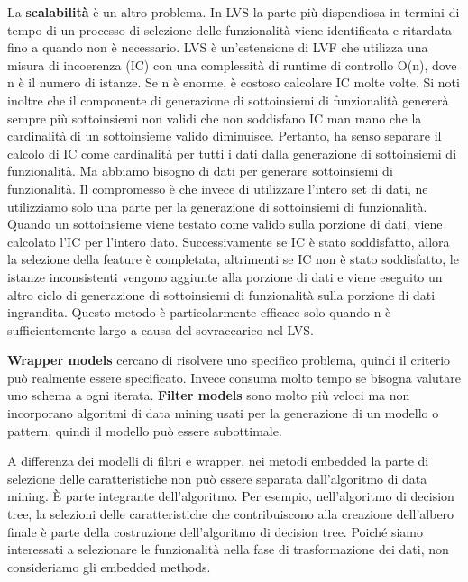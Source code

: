 \documentclass[a4paper]{extarticle}
\begin{document}
La \textbf{scalabilità} è un altro problema. In LVS la parte più dispendiosa in termini di tempo di un processo di selezione delle funzionalità viene identificata e ritardata fino a quando non è necessario. LVS è un'estensione di LVF che utilizza una misura di incoerenza (IC) con una complessità di runtime di controllo O(n), dove n è il numero di istanze. Se n è enorme, è costoso calcolare IC molte volte. Si noti inoltre che il componente di generazione di sottoinsiemi di funzionalità genererà sempre più sottoinsiemi non validi che non soddisfano IC man mano che la cardinalità di un sottoinsieme valido diminuisce. Pertanto, ha senso separare il calcolo di IC come cardinalità per tutti i dati dalla generazione di sottoinsiemi di funzionalità. Ma abbiamo bisogno di dati per generare sottoinsiemi di funzionalità. Il compromesso è che invece di utilizzare l'intero set di dati, ne utilizziamo solo una parte per la generazione di sottoinsiemi di funzionalità. Quando un sottoinsieme viene testato come valido sulla porzione di dati, viene calcolato l'IC per l'intero dato. Successivamente se IC è stato soddisfatto, allora la selezione della feature è completata, altrimenti se IC non è stato soddisfatto, le istanze inconsistenti vengono aggiunte alla porzione di dati e viene eseguito un altro ciclo di generazione di sottoinsiemi di funzionalità sulla porzione di dati ingrandita. Questo metodo è particolarmente efficace solo quando n è sufficientemente largo a causa del sovraccarico nel LVS.

\textbf{Wrapper models} cercano di risolvere uno specifico problema, quindi il criterio può realmente essere specificato. Invece consuma molto tempo se bisogna valutare uno schema a ogni iterata. \textbf{Filter models} sono molto più veloci  ma non incorporano algoritmi di data mining usati per la generazione di un modello o pattern, quindi il modello può essere subottimale.

A differenza dei modelli di filtri e wrapper, nei metodi embedded la parte di selezione delle caratteristiche non può essere separata dall'algoritmo di data mining. È parte integrante dell'algoritmo. Per esempio, nell'algoritmo di decision tree, la selezioni delle caratteristiche che contribuiscono alla creazione dell'albero finale è parte della costruzione dell'algoritmo di decision tree. Poiché siamo interessati a selezionare le funzionalità nella fase di trasformazione dei dati, non consideriamo gli embedded methods.
\end{document}
